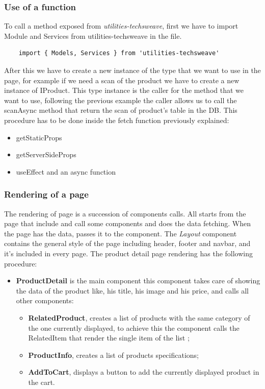 \subsubsection{Use of a function}
To call a method exposed from \textit{utilities-techsweave}, first we have to import Module and Services from utilities-techsweave in the file.
\begin{lstlisting}
    import { Models, Services } from 'utilities-techsweave'
\end{lstlisting}
After this we have to create a new instance of the type that we want to use in the page, for example if we need a scan of the product we have to create a new instance of {\selectfont IProduct}. This type instance is the caller for the method that we want to use, following the previous example the caller allows us to call the {\selectfont scanAsync} method that return the scan of product's table in the DB. This procedure has to be done inside the fetch function previously explained:
\begin{itemize}
  \item {\selectfont getStaticProps}
  \item {\selectfont getServerSideProps}
  \item {\selectfont useEffect and an async function}
\end{itemize}
\subsubsection{Rendering of a page}
The rendering of page  is a succession of components calls. All starts from the page that include and call some components and does the data fetching. When the page has the data, passes it to the component. The \textit{Layout} component contains the general style of the page including header, footer and navbar, and it's included in every page. The product detail page rendering has the following procedure:
\begin{itemize}
  \item \textbf{ProductDetail} is the main component this component takes care of showing the data of the product like, his title, his image and his price, and calls all other components:
        \begin{itemize}
          \item \textbf{RelatedProduct}, creates a list of products with the same category of the one currently displayed, to achieve this the component calls the RelatedItem that render the single item of the list ;
          \item \textbf{ProductInfo}, creates a list of products specifications;
          \item \textbf{AddToCart}, displays a button to add the currently displayed product in the cart.
        \end{itemize}
\end{itemize}

